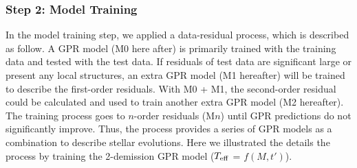 \subsubsection{Step 2:  Model Training}

In the model training step, we applied a data-residual process, which is described as follow. 
A GPR model (M0 here after) is primarily trained with the training data and tested with the test data. If residuals of test data are significant large or present any local structures, an extra GPR model (M1 hereafter) will be trained to describe the first-order residuals. With M0 + M1, the second-order residual could be calculated and used to train another extra GPR model (M2 hereafter). The training process goes to $n$-order residuals (M$n$) until GPR predictions do not significantly improve. Thus, the process provides a series of GPR models as a combination to describe stellar evolutions. Here we illustrated the details the process by training the 2-demission GPR model ($T_{\rm eff}$ = $f(M, t')$). 

